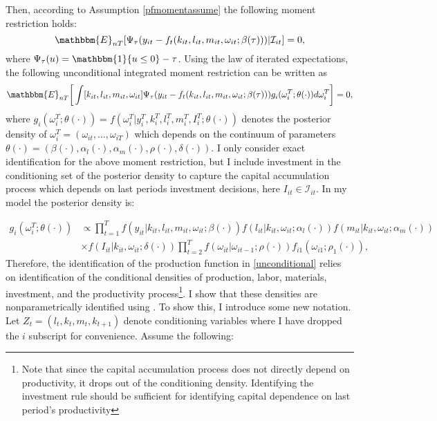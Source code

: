 \documentclass{article}
\begin{document}
Then, according to Assumption \ref{pfmomentassume} the following moment restriction holds:
\begin{equation}
\mathbbm{E}_{nT}[\Psi_{\tau}(y_{it}-f_{t}(k_{it}, l_{it}, m_{it}, \omega_{it}; \beta(\tau)))|\mathcal{I}_{it}]=0,
\end{equation}
where $\Psi_{\tau}(u)=\mathbbm{1}\{u\leq0\}-\tau$. Using the law of iterated expectations, the following unconditional integrated moment restriction can be written as
\begin{equation} \label{unconditional}
\mathbbm{E}_{nT}\bigg[\int[k_{it}, l_{it}, m_{it}, \omega_{it}]\Psi_{\tau}(y_{it}-f_{t}(k_{it}, l_{it}, m_{it}, \omega_{it}; \beta(\tau)))g_{i}(\omega^{T}_{i};\theta(\cdot))d\omega^{T}_{i}\bigg]=0,
\end{equation}
where $g_{i}(\omega^{T}_{i};\theta(\cdot))=f(\omega^{T}_{i}|y^{T}_{i}, k^{T}_{i}, l^{T}_{i}, m^{T}_{i}, I^{T}_{i};\theta(\cdot))$ denotes the posterior density of $\omega^{T}_{i}=(\omega_{it},\dots,\omega_{iT})$ which depends on the continuum of parameters $\theta(\cdot)=(\beta(\cdot), \alpha_{l}(\cdot), \alpha_{m}(\cdot), \rho(\cdot), \delta(\cdot))$. I only consider exact identification for the above moment restriction, but I include investment in the conditioning set of the posterior density to capture the capital accumulation process which depends on last periods investment decisions, here $I_{it}\in\mathcal{I}_{it}$. In my model the posterior density is:

\begin{equation}\label{posterior}
\begin{split}
g_{i}(\omega^{T}_{i};\theta(\cdot))& \propto\prod_{t=1}^{T}f(y_{it}|k_{it}, l_{it}, m_{it}, \omega_{it};\beta(\cdot))f(l_{it}|k_{it}, \omega_{it};\alpha_{l}(\cdot))f(m_{it}|k_{it}, \omega_{it};\alpha_{m}(\cdot)) \\
&\times f(I_{it}|k_{it}, \omega_{it};\delta(\cdot))\prod_{t=2}^{T}f(\omega_{it}|\omega_{it-1};\rho(\cdot))f_{i1}(\omega_{i1};\rho_{1}(\cdot)),
\end{split}
\end{equation}
Therefore, the identification of the production function in \eqref{unconditional} relies on identification of the conditional densities of production, labor, materials, investment, and the productivity process\footnote{Note that since the capital accumulation process does not directly depend on productivity, it drops out of the conditioning density. Identifying the investment rule should be sufficient for identifying capital dependence on last period's productivity}. I show that these densities are nonparametrically identified using \cite{Hu2008}. To show this, I introduce some new notation. Let $Z_{t}=(l_{t}, k_{t}, m_{t}, k_{t+1})$ denote conditioning variables where I have dropped the $i$ subscript for convenience. Assume the following: 
\end{document}
